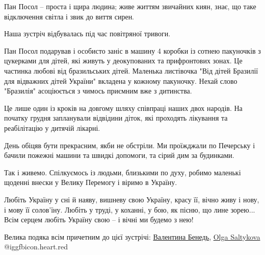 Пан Посол -- проста і щира людина; живе життям звичайних киян, знає, що таке
відключення світла і звик до виття сирен.

Наша зустріч відбувалась під час повітряної тривоги.

Пан Посол подарував і особисто заніс в машину 4 коробки із сотнею пакуночків з
цукерками для дітей, які живуть у деокупованих та прифронтових зонах. Це
частинка любові від бразильських дітей. Маленька листівочка "Від дітей Бразилії
для відважних дітей України" вкладена у кожному пакуночку. Нехай слово
"Бразилія" асоціюється з чимось приємним вже з дитинства.


Це лише один із кроків на довгому шляху співпраці наших двох народів. На
початку грудня запланували відвідини діток, які проходять лікування  та
реабілітацію у  дитячій лікарні. 

День обіцяв бути прекрасним, якби не обстріли. Ми проїжджали по Печерську і
бачили пожежні машини та швидкі допомоги, та сірий дим за будинками. 

Так і живемо. Спілкуємось із людьми, близькими по духу, робимо маленькі щоденні
внески у Велику Перемогу і віримо в Україну. 

\obeycr
Любіть Україну у сні й наяву,
вишневу свою Україну,
красу її, вічно живу і нову,
і мову її солов'їну.
Любіть у труді, у коханні, у бою,
як пісню, що лине зорею...
Всім серцем любіть Україну свою -- 
і вічні ми будемо з нею!
\restorecr

Велика подяка всім причетним до цієї зустрічі: \href{https://www.facebook.com/profile.php?id=100000946332209}{Валентина Бенедь}, 
\href{https://www.facebook.com/olga.mysholov}{Olga Saltykova}
@igg{fbicon.heart.red}

